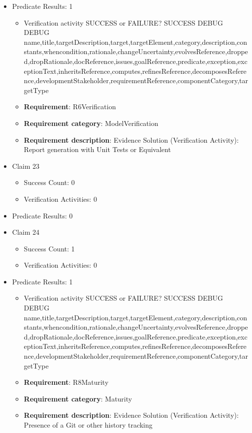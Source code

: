 \documentclass{article}
\begin{document}
\begin{itemize}
									    
				\item Predicate Results: 1
					\begin{itemize}				
					\item Verification activity SUCCESS or FAILURE? SUCCESS
					DEBUG DEBUG name,title,targetDescription,target,targetElement,category,description,constants,whencondition,rationale,changeUncertainty,evolvesReference,dropped,dropRationale,docReference,issues,goalReference,predicate,exception,exceptionText,inheritsReference,computes,refinesReference,decomposesReference,developmentStakeholder,requirementReference,componentCategory,targetType
					\item \textbf{Requirement}: R6Verification 
					\item \textbf{Requirement category}: ModelVerification
					\item \textbf{Requirement description}: Evidence Solution (Verification Activity): Report generation with Unit Tests or Equivalent
					\end{itemize}

  				  \item Claim 23
				\begin{itemize}
			    	\item Success Count: 0 
			    	\item Verification Activities: 0
				\end{itemize}
				
									    
				\item Predicate Results: 0

  				  \item Claim 24
				\begin{itemize}
			    	\item Success Count: 1 
			    	\item Verification Activities: 0
				\end{itemize}
				
									    
				\item Predicate Results: 1
					\begin{itemize}				
					\item Verification activity SUCCESS or FAILURE? SUCCESS
					DEBUG DEBUG name,title,targetDescription,target,targetElement,category,description,constants,whencondition,rationale,changeUncertainty,evolvesReference,dropped,dropRationale,docReference,issues,goalReference,predicate,exception,exceptionText,inheritsReference,computes,refinesReference,decomposesReference,developmentStakeholder,requirementReference,componentCategory,targetType
					\item \textbf{Requirement}: R8Maturity 
					\item \textbf{Requirement category}: Maturity
					\item \textbf{Requirement description}: Evidence Solution (Verification Activity): Presence of a Git or other history tracking
					\end{itemize}


\end{itemize}
\end{document}
